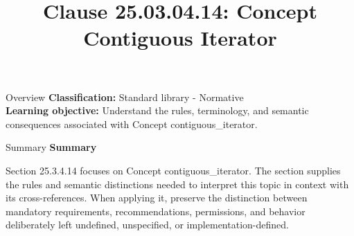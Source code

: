 \documentclass[10pt,letterpaper]{article}
\title{Clause 25.03.04.14: Concept Contiguous Iterator}
\author{}
\date{}
\begin{document}
\maketitle
\begin{CornellOverviewBox}{Overview}
\textbf{Classification:} Standard library - Normative\\[2pt]
\textbf{Learning objective:} Understand the rules, terminology, and semantic consequences associated with Concept contiguous\_iterator.
\end{CornellOverviewBox}\begin{CornellSummaryBox}{Summary}
{\sffamily\bfseries\color{Accent} Summary}\par\vspace{3pt}Section 25.3.4.14 focuses on Concept contiguous\_iterator. The section supplies the rules and semantic distinctions needed to interpret this topic in context with its cross-references. When applying it, preserve the distinction between mandatory requirements, recommendations, permissions, and behavior deliberately left undefined, unspecified, or implementation-defined.
\end{CornellSummaryBox}
\end{document}
